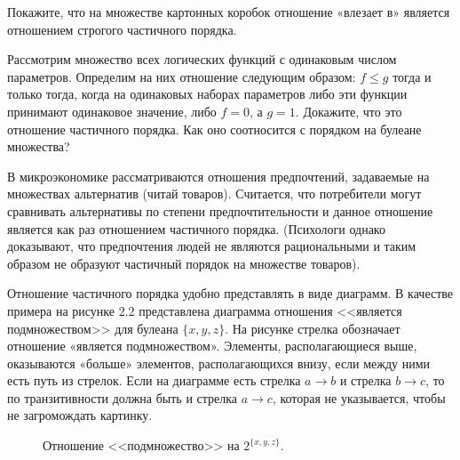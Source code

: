 \begin{exercise}
Покажите, что на множестве картонных коробок отношение «влезает в» является отношением строгого частичного порядка.
\end{exercise}

\begin{exercise}
Рассмотрим множество всех логических функций с одинаковым числом параметров. Определим на них отношение следующим образом: $f\le g$ тогда и только тогда, когда на одинаковых наборах параметров либо эти функции принимают одинаковое значение, либо $f=0$, а $g=1$. Докажите, что это отношение частичного порядка. Как оно соотносится с порядком на булеане множества?
\end{exercise}

\begin{example}
В микроэкономике рассматриваются отношения предпочтений, задаваемые на множествах альтернатив (читай товаров). Считается, что потребители могут сравнивать альтернативы по степени предпочтительности и данное отношение является как раз отношением частичного порядка. (Психологи однако доказывают, что предпочтения людей не являются рациональными и таким образом не образуют частичный порядок на множестве товаров).
\end{example}

Отношение частичного порядка удобно представлять в виде диаграмм. В качестве примера на рисунке 2.2 представлена диаграмма отношения <<является подмножеством>> для булеана $\{x, y, z\}$. На рисунке стрелка обозначает отношение «является подмножеством». Элементы, располагающиеся выше, оказываются «больше» элементов, располагающихся внизу, если между ними есть путь из стрелок. Если на диаграмме есть стрелка $a\to b$ и стрелка $b\to c$, то по транзитивности должна быть и стрелка $a\to c$, которая не указывается, чтобы не загромождать картинку.

\begin{figure}[h]
\centering
{}
\caption{Отношение <<подмножество>> на $2^{\{x, y, z\}}$.}
\end{figure}

